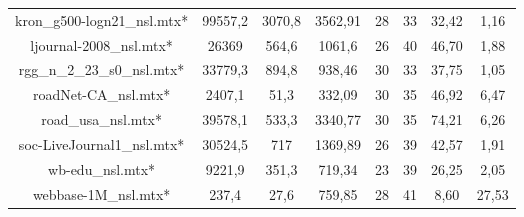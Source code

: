 \documentclass[journal]{IEEEtran}
\begin{document}
\begin{table}[]
\begin{tabular}{|c|c|c|c|c|c|c|c|}
kron\_g500-logn21\_nsl.mtx*  & 99557,2        & 3070,8     & 3562,91     & 28                & 33                 & 32,42              & 1,16                   \\
ljournal-2008\_nsl.mtx*      & 26369          & 564,6      & 1061,6      & 26                & 40                 & 46,70              & 1,88                   \\
rgg\_n\_2\_23\_s0\_nsl.mtx*  & 33779,3        & 894,8      & 938,46      & 30                & 33                 & 37,75              & 1,05                   \\
roadNet-CA\_nsl.mtx*         & 2407,1         & 51,3       & 332,09      & 30                & 35                 & 46,92              & 6,47                   \\
road\_usa\_nsl.mtx*          & 39578,1        & 533,3      & 3340,77     & 30                & 35                 & 74,21              & 6,26                   \\
soc-LiveJournal1\_nsl.mtx*   & 30524,5        & 717        & 1369,89     & 26                & 39                 & 42,57              & 1,91                   \\
wb-edu\_nsl.mtx*             & 9221,9         & 351,3      & 719,34      & 23                & 39                 & 26,25              & 2,05                   \\
webbase-1M\_nsl.mtx*         & 237,4          & 27,6       & 759,85      & 28                & 41                 & 8,60               & 27,53                 \\
\hline
\end{tabular}
\end{table}
\end{document}
